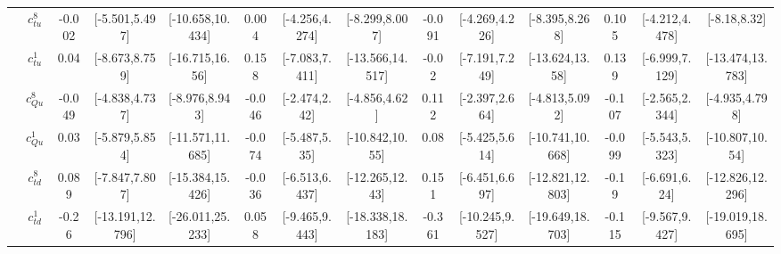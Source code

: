 \documentclass{article}
\begin{document}
\begin{table}[H]
\begin{tabular}{|c|c|c|c|c|c|c|c|c|c|c|c|c|c|}
 & $c_{tu}^{8}$ & -0.002                             & [-5.501,5.497]                                 & [-10.658,10.434] & 0.004                             & [-4.256,4.274]                                 & [-8.299,8.007] & -0.091                             & [-4.269,4.226]                                 & [-8.395,8.268] & 0.105                             & [-4.212,4.478]                                 & [-8.18,8.32] \\ \cline{2-14}
 & $c_{tu}^{1}$ & 0.04                             & [-8.673,8.759]                                 & [-16.715,16.56] & 0.158                             & [-7.083,7.411]                                 & [-13.566,14.517] & -0.02                             & [-7.191,7.249]                                 & [-13.624,13.58] & 0.139                             & [-6.999,7.129]                                 & [-13.474,13.783] \\ \cline{2-14}
 & $c_{Qu}^{8}$ & -0.049                             & [-4.838,4.737]                                 & [-8.976,8.943] & -0.046                             & [-2.474,2.42]                                 & [-4.856,4.62] & 0.112                             & [-2.397,2.664]                                 & [-4.813,5.092] & -0.107                             & [-2.565,2.344]                                 & [-4.935,4.798] \\ \cline{2-14}
 & $c_{Qu}^{1}$ & 0.03                             & [-5.879,5.854]                                 & [-11.571,11.685] & -0.074                             & [-5.487,5.35]                                 & [-10.842,10.55] & 0.08                             & [-5.425,5.614]                                 & [-10.741,10.668] & -0.099                             & [-5.543,5.323]                                 & [-10.807,10.54] \\ \cline{2-14}
 & $c_{td}^{8}$ & 0.089                             & [-7.847,7.807]                                 & [-15.384,15.426] & -0.036                             & [-6.513,6.437]                                 & [-12.265,12.43] & 0.151                             & [-6.451,6.697]                                 & [-12.821,12.803] & -0.19                             & [-6.691,6.24]                                 & [-12.826,12.296] \\ \cline{2-14}
 & $c_{td}^{1}$ & -0.26                             & [-13.191,12.796]                                 & [-26.011,25.233] & 0.058                             & [-9.465,9.443]                                 & [-18.338,18.183] & -0.361                             & [-10.245,9.527]                                 & [-19.649,18.703] & -0.115                             & [-9.567,9.427]                                 & [-19.019,18.695] \\ \cline{2-14}

\end{tabular}
\end{table}
\end{document}
